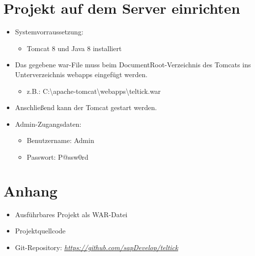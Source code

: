 \documentclass[12pt, a4paper]{article}
\begin{document}
\section{Projekt auf dem Server einrichten}
	\begin{itemize}
		\item Systemvorraussetzung:
			\begin{itemize}
				\item Tomcat 8 und Java 8 installiert
			\end{itemize}
		\item Das gegebene war-File muss beim \glqq DocumentRoot-Verzeichnis\grqq{} des Tomcats ins Unterverzeichnis \glqq webapps\grqq{} eingefügt werden.
	\begin{itemize}
		\item z.B.: \glqq C:\textbackslash{}apache-tomcat\textbackslash{}webapps\textbackslash{}teltick.war\grqq{}
	\end{itemize}
		\item Anschließend kann der Tomcat gestart werden.
		\item Admin-Zugangsdaten:
  		\begin{itemize}
        	 \item Benutzername: Admin
        	 \item Passwort: P@ssw0rd
      	\end{itemize}
	\end{itemize}


\section{Anhang}
\begin{itemize}
	\item Ausführbares Projekt als \glqq WAR-Datei\grqq{}
	\item Projektquellcode
	\item Git-Repository: \textit{\href{https://github.com/sapDevelop/teltick}{https://github.com/sapDevelop/teltick}}
\end{itemize}
\end{document}
